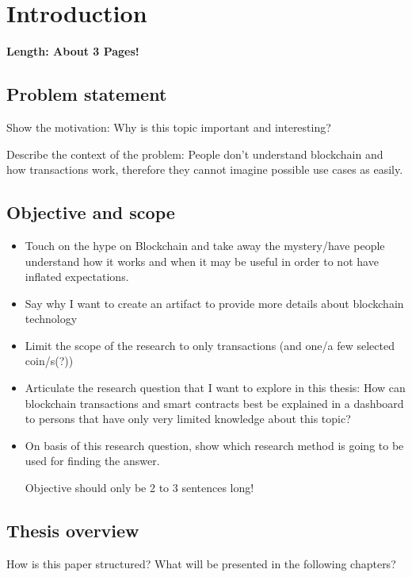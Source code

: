 \chapter{Introduction}
\label{chapter:Intro}

\textbf{Length: About 3 Pages!}

\section{Problem statement} \label{sec:Problem}

Show the motivation: Why is this topic important and interesting?

Describe the context of the problem: People don't understand blockchain and how transactions work, therefore they cannot imagine possible use cases as easily.

\section{Objective and scope} \label{sec:Objective}
\begin{itemize}
    \item Touch on the hype on Blockchain and take away the mystery/have people understand how it works and when it may be useful in order to not have inflated expectations.
    \item Say why I want to create an artifact to provide more details about blockchain technology
    \item Limit the scope of the research to only transactions (and one/a few selected coin/s(?))
    \item Articulate the research question that I want to explore in this thesis: How can blockchain transactions and smart contracts best be explained in a dashboard to persons that have only very limited knowledge about this topic?
    \item On basis of this research question, show which research method is going to be used for finding the answer.
    
    Objective should only be 2 to 3 sentences long!
    
\end{itemize}

\section{Thesis overview} \label{sec:ThesisOverview}
How is this paper structured? What will be presented in the following chapters?


